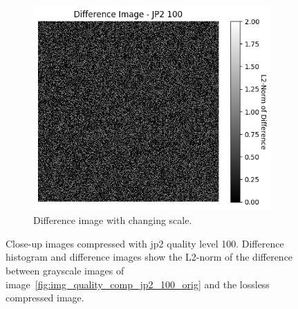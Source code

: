 \begin{figure}[htb]
\begin{subfigure}[b]{0.48\textwidth}
        \label{fig:img_quality_comp_jp2_100_center_diff}
    \end{subfigure}
    \begin{subfigure}[b]{0.48\textwidth}
        \centering
        \includegraphics[width=\textwidth]{doc/thesis/0_figures/compare_quality/set1/jp2_100_center_diff_heatmap_rel.png}
        \caption{Difference image with changing scale.}
        \label{fig:img_quality_comp_jp2_100_center_diff_rel}
    \end{subfigure}
    \caption{Close-up images compressed with \gls{jp2} quality level 100. Difference histogram and difference images show the L2-norm of the difference between grayscale images of image~\ref{fig:img_quality_comp_jp2_100_orig} and the lossless compressed image.}
    \label{fig:img_quality_comp_jp2_100_center}
\end{figure}

